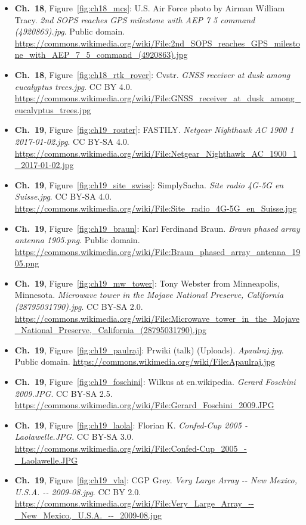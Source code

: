 \begin{small}
\begin{itemize}[leftmargin=0pt,itemsep=2pt,label={}]
\item \textbf{Ch.~18}, Figure~\ref{fig:ch18_mcs}: U.S. Air Force photo by Airman William Tracy. \emph{2nd SOPS reaches GPS milestone with AEP 7 5 command (4920863).\allowbreak{}jpg}. Public domain. \url{https://commons.wikimedia.org/wiki/File:2nd_SOPS_reaches_GPS_milestone_with_AEP_7_5_command_(4920863).jpg}
\item \textbf{Ch.~18}, Figure~\ref{fig:ch18_rtk_rover}: Cvstr. \emph{GNSS receiver at dusk among eucalyptus trees.\allowbreak{}jpg}. CC BY 4.0. \url{https://commons.wikimedia.org/wiki/File:GNSS_receiver_at_dusk_among_eucalyptus_trees.jpg}
\item \textbf{Ch.~19}, Figure~\ref{fig:ch19_router}: FASTILY. \emph{Netgear Nighthawk AC 1900 1 2017-\allowbreak{}01-\allowbreak{}02.\allowbreak{}jpg}. CC BY-SA 4.0. \url{https://commons.wikimedia.org/wiki/File:Netgear_Nighthawk_AC_1900_1_2017-01-02.jpg}
\item \textbf{Ch.~19}, Figure~\ref{fig:ch19_site_swiss}: SimplySacha. \emph{Site radio 4G-\allowbreak{}5G en Suisse.\allowbreak{}jpg}. CC BY-SA 4.0. \url{https://commons.wikimedia.org/wiki/File:Site_radio_4G-5G_en_Suisse.jpg}
\item \textbf{Ch.~19}, Figure~\ref{fig:ch19_braun}: Karl Ferdinand Braun. \emph{Braun phased array antenna 1905.\allowbreak{}png}. Public domain. \url{https://commons.wikimedia.org/wiki/File:Braun_phased_array_antenna_1905.png}
\item \textbf{Ch.~19}, Figure~\ref{fig:ch19_mw_tower}: Tony Webster from Minneapolis, Minnesota. \emph{Microwave tower in the Mojave National Preserve, California (28795031790).\allowbreak{}jpg}. CC BY-SA 2.0. \url{https://commons.wikimedia.org/wiki/File:Microwave_tower_in_the_Mojave_National_Preserve,_California_(28795031790).jpg}
\item \textbf{Ch.~19}, Figure~\ref{fig:ch19_paulraj}: Prwiki (talk) (Uploads). \emph{Apaulraj.\allowbreak{}jpg}. Public domain. \url{https://commons.wikimedia.org/wiki/File:Apaulraj.jpg}
\item \textbf{Ch.~19}, Figure~\ref{fig:ch19_foschini}: Wilkus at en.wikipedia. \emph{Gerard Foschini 2009.\allowbreak{}JPG}. CC BY-SA 2.5. \url{https://commons.wikimedia.org/wiki/File:Gerard_Foschini_2009.JPG}
\item \textbf{Ch.~19}, Figure~\ref{fig:ch19_laola}: Florian K. \emph{Confed-\allowbreak{}Cup 2005 -\allowbreak{} Laolawelle.\allowbreak{}JPG}. CC BY-SA 3.0. \url{https://commons.wikimedia.org/wiki/File:Confed-Cup_2005_-_Laolawelle.JPG}
\item \textbf{Ch.~19}, Figure~\ref{fig:ch19_vla}: CGP Grey. \emph{Very Large Array -\allowbreak{}-\allowbreak{} New Mexico, U.\allowbreak{}S.\allowbreak{}A.\allowbreak{} -\allowbreak{}-\allowbreak{} 2009-\allowbreak{}08.\allowbreak{}jpg}. CC BY 2.0. \url{https://commons.wikimedia.org/wiki/File:Very_Large_Array_--_New_Mexico,_U.S.A._--_2009-08.jpg}

\end{itemize}
\end{small}
